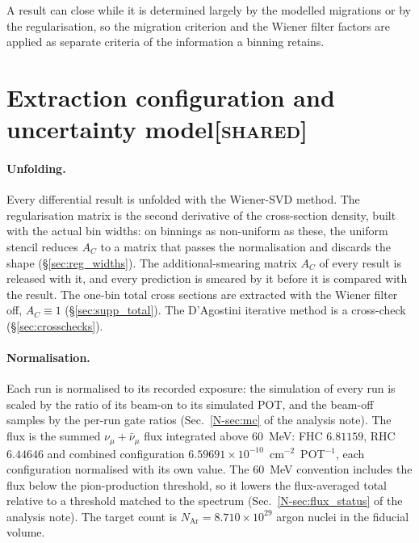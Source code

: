 \documentclass[11pt,a4paper]{article}
\newcommand{\noteref}[2]{#1~\ref{N-#2} of the analysis note}
\newcommand{\scopetag}[1]{\hfill{\normalfont\small\textsc{[#1]}}}
\begin{document}
A result can close while it is determined largely by the modelled migrations or by the
regularisation, so the migration criterion and the Wiener filter factors are applied as separate
criteria of the information a binning retains.

\section[Extraction configuration and uncertainty model]{Extraction configuration and uncertainty model\scopetag{shared}}
\label{sec:supp_extraction}

\paragraph{Unfolding.} Every differential result is unfolded with the Wiener-SVD method. The
regularisation matrix is the second derivative of the cross-section density, built with the actual bin
widths: on binnings as non-uniform as these, the uniform stencil reduces $A_C$ to a matrix that passes
the normalisation and discards the shape (\S\ref{sec:reg_widths}). The additional-smearing matrix
$A_C$ of every result is released with it, and every prediction is smeared by it before it is
compared with the result. The one-bin total cross sections are extracted with the Wiener filter off,
$A_C\equiv1$ (\S\ref{sec:supp_total}). The D'Agostini iterative method is a cross-check
(\S\ref{sec:crosschecks}).

\paragraph{Normalisation.} Each run is normalised to its recorded exposure: the simulation of every run
is scaled by the ratio of its beam-on to its simulated POT, and the beam-off samples by the per-run
gate ratios (\noteref{Sec.}{sec:mc}). The flux is the summed $\nu_\mu+\bar\nu_\mu$ flux integrated
above $60$~MeV: FHC $6.81159$, RHC $6.44646$ and combined configuration
$6.59691\times10^{-10}$~cm$^{-2}$~POT$^{-1}$, each configuration normalised with its own value. The
$60$~MeV convention includes the flux below the pion-production threshold, so it lowers the
flux-averaged total relative to a threshold matched to the spectrum (\noteref{Sec.}{sec:flux_status}).
The target count is $N_\mathrm{Ar}=8.710\times10^{29}$ argon nuclei in the fiducial volume.
\end{document}
